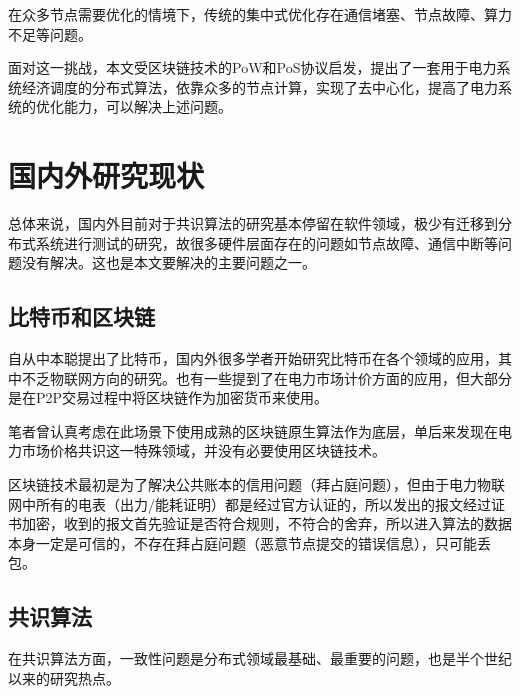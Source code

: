 在众多节点需要优化的情境下，传统的集中式优化存在通信堵塞、节点故障、算力不足等问题。

面对这一挑战，本文受区块链技术的PoW和PoS协议启发，提出了一套用于电力系统经济调度的分布式算法，依靠众多的节点计算，实现了去中心化，提高了电力系统的优化能力，可以解决上述问题。

\section{国内外研究现状}

总体来说，国内外目前对于共识算法的研究基本停留在软件领域，极少有迁移到分布式系统进行测试的研究，故很多硬件层面存在的问题如节点故障、通信中断等问题没有解决。这也是本文要解决的主要问题之一。

\subsection{比特币和区块链}

自从中本聪提出了比特币\cite{nakamoto2008bitcoin}，国内外很多学者开始研究比特币在各个领域的应用，其中不乏物联网方向的研究\cite{zhang2017iot}。也有一些提到了在电力市场计价方面的应用，但大部分是在P2P交易过程中将区块链作为加密货币来使用\cite{tai2016electricity}。

笔者曾认真考虑在此场景下使用成熟的区块链原生算法作为底层，单后来发现在电力市场价格共识这一特殊领域，并没有必要使用区块链技术。

区块链技术最初是为了解决公共账本的信用问题（拜占庭问题），但由于电力物联网中所有的电表（出力/能耗证明）都是经过官方认证的，所以发出的报文经过证书加密，收到的报文首先验证是否符合规则，不符合的舍弃，所以进入算法的数据本身一定是可信的，不存在拜占庭问题（恶意节点提交的错误信息），只可能丢包。

\subsection{共识算法}

在共识算法方面，一致性问题是分布式领域最基础、最重要的问题，也是半个世纪以来的研究热点。



